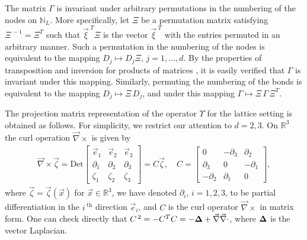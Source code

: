 \documentclass{cmslatex}
\newcommand\bDelta{\mbox{\boldmath${\Delta}$}}
\begin{document}
The matrix $\Gamma$ is invariant under arbitrary permutations in the
numbering of the nodes on $\mathbb{N}_L$. More specifically, let  
$\Xi$ be a permutation matrix satisfying $\Xi^{\,-1}=\Xi^T$ such that
$\vec{\xi}^{\; T}\Xi$ is the vector $\vec{\xi}^{\; T}$ with the entries permuted in
an arbitrary manner. Such a permutation in the numbering of the nodes is
equivalent to the mapping $D_j\mapsto D_j\Xi$, $j=1,\ldots,d$. By the properties of
transposition and inversion for products of matrices
\cite{Horn_Johnson-1990}, it is easily verified that $\Gamma$ is invariant
under this mapping. Similarly, permuting the numbering of
the bonds is equivalent to the mapping $D_j\mapsto \Xi\,D_j$, and under this
mapping $\Gamma\mapsto \Xi\,\Gamma\, \Xi^T$.




The projection matrix representation of the operator $\Upsilon$ for the
lattice setting is obtained as follows. For simplicity, we restrict
our attention to $d=2,3$. On $\mathbb{R}^3$ the curl 
operation $\vec{\nabla}\times$ is given by 
%
\begin{align}\label{eq:Curl_3D}
  \vec{\nabla}\times\vec{\zeta}=
     \text{Det}\left[
  \begin{array}{ccc}
    \vec{e}_1 &\vec{e}_2 &\vec{e}_3\\
       \partial_1    &   \partial_2    &   \partial_3   \\
       \zeta_1    &   \zeta_2    &   \zeta_3   
    \end{array}
    \right]
    =C\vec{\zeta}, \quad
    C=
    \left[
    \begin{array}{ccc}
       0  & -\partial_3  &   \partial_2 \\
       \partial_3 &  0   &  -\partial_1 \\
      -\partial_2 &  \partial_1  &   0
    \end{array}
    \right],    
\end{align}
%
where $\vec{\zeta}=\vec{\zeta}(\vec{x})$ for $\vec{x}\in\mathbb{R}^3$, we
have denoted $\partial_i$, $i=1,2,3$, to be partial differentiation in the
$i^{\;\text{th}}$ direction $\vec{e}_i$, and $C$ is the curl
operator $\vec{\nabla}\times$ in matrix form. One can check directly
that $C^{\,2}=-C^TC=-\bDelta+\vec{\nabla}\vec{\nabla}\cdot$, where $\bDelta$ is the vector
Laplacian.
\end{document}
